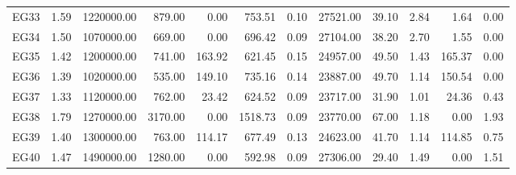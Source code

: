 \begin{tabular}{lrrrrrrrrrrr}
    EG33 & 1.59 & 1220000.00 & 879.00 & 0.00 & 753.51 & 0.10 & 27521.00 & 39.10 & 2.84 & 1.64 & 0.00 \\
    EG34 & 1.50 & 1070000.00 & 669.00 & 0.00 & 696.42 & 0.09 & 27104.00 & 38.20 & 2.70 & 1.55 & 0.00 \\
    EG35 & 1.42 & 1200000.00 & 741.00 & 163.92 & 621.45 & 0.15 & 24957.00 & 49.50 & 1.43 & 165.37 & 0.00 \\
    EG36 & 1.39 & 1020000.00 & 535.00 & 149.10 & 735.16 & 0.14 & 23887.00 & 49.70 & 1.14 & 150.54 & 0.00 \\
    EG37 & 1.33 & 1120000.00 & 762.00 & 23.42 & 624.52 & 0.09 & 23717.00 & 31.90 & 1.01 & 24.36 & 0.43 \\
    EG38 & 1.79 & 1270000.00 & 3170.00 & 0.00 & 1518.73 & 0.09 & 23770.00 & 67.00 & 1.18 & 0.00 & 1.93 \\
    EG39 & 1.40 & 1300000.00 & 763.00 & 114.17 & 677.49 & 0.13 & 24623.00 & 41.70 & 1.14 & 114.85 & 0.75 \\
    EG40 & 1.47 & 1490000.00 & 1280.00 & 0.00 & 592.98 & 0.09 & 27306.00 & 29.40 & 1.49 & 0.00 & 1.51 \\
    \bottomrule
    \end{tabular}
    
